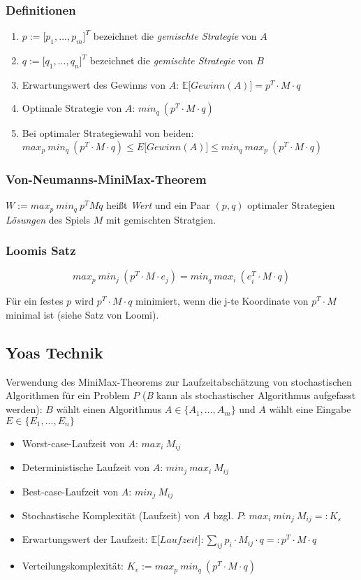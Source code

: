 \subsubsection{Definitionen}
\begin{enumerate}
	\item \(p := \lbrack p_1,...,p_m \rbrack^T \) bezeichnet die \textit{gemischte Strategie} von \(A\)
	\item \(q := \lbrack q_1,...,q_n \rbrack^T \) bezeichnet die \textit{gemischte Strategie} von \(B\)
	\item Erwartungswert des Gewinns von \(A\): \(\mathbb{E}\lbrack Gewinn(A) \rbrack = p^T \cdot M \cdot q\)
	\item Optimale Strategie von \(A\): \(min_q~(p^T \cdot M \cdot q)\)
	\item Bei optimaler Strategiewahl von beiden: \\ \(max_p~min_q~(p^T \cdot M \cdot q) \leq E \lbrack Gewinn(A) \rbrack \leq min_q~max_p~(p^T \cdot M \cdot q)\)
\end{enumerate}

\subsubsection{Von-Neumanns-MiniMax-Theorem}
\(W := max_p~min_q~p^TMq\) heißt \textit{Wert} und ein Paar \((p,q)\) optimaler Strategien \textit{Lösungen} des Spiels \(M\) mit gemischten Stratgien.

\subsubsection{Loomis Satz}
\[max_p~min_j~(p^T \cdot M \cdot e_j) = min_q~max_i~(e_i^T \cdot M \cdot q)\]

Für ein festes \(p\) wird \(p^T \cdot M \cdot q\) minimiert, wenn die j-te Koordinate von \(p^T \cdot M\) minimal ist (siehe Satz von Loomi).


\subsection{Yoas Technik}
Verwendung des MiniMax-Theorems zur Laufzeitabschätzung von stochastischen Algorithmen für ein Problem \(P\) (\textit{B} kann als stochastischer Algorithmus aufgefasst werden):
\(B\) wählt einen Algorithmus \(A \in \{A_1,...,A_m\}\) und \(A\) wählt eine Eingabe \(E \in \{E_1,...,E_n\}\)
\begin{itemize}
	\item Worst-case-Laufzeit von \(A\): \(max_i~M_{ij}\)
	\item Deterministische Laufzeit von \(A\): \(min_j~max_i~M_{ij}\)
	\item Best-case-Laufzeit von \(A\): \(min_j~M_{ij}\)
	\item Stochastische Komplexität (Laufzeit) von \(A\) bzgl. \(P\): \(max_i~min_j~M_{ij} =: K_s\)
	\item Erwartungswert der Laufzeit: \(\mathbb{E}\lbrack Laufzeit \rbrack: \sum_{ij} p_i \cdot M_{ij} \cdot q =: p^T \cdot M \cdot q\)
	\item Verteilungskomplexität: \(K_v := max_p~min_q~(p^T \cdot M \cdot q)\)
\end{itemize}

